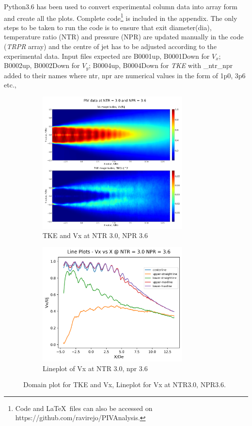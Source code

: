 \par\par
Python3.6 has been used to convert experimental column data into array form and create all the plots. Complete code\footnote{ Code and \LaTeX \ files can also be accessed on https://github.com/ravirejo/PIVAnalysis.} is included in the appendix. The only steps to be taken to run the code is to ensure that exit diameter(dia), temperature ratio (NTR) and pressure (NPR) are updated manually in the code (\textit{TRPR }array) and the centre of jet has to be adjusted according to the experimental data. Input files expected are B0001up, B0001Down for \textit{$V_x$}; B0002up, B0002Down for \textit{$V_y$}; B0004up, B0004Down for \textit{TKE} with \_ntr\_npr added to their names where ntr, npr are numerical values in the form of 1p0, 3p6 etc.,

\begin{figure}[H]
\begin{subfigure}{.5\textwidth}
	\centering
	\includegraphics[width=3in]{images/2dsample.png}
	\caption{TKE and Vx at NTR 3.0, NPR 3.6}
	\label{fig:2dsample}
\end{subfigure}%
\begin{subfigure}{.5\textwidth}
	\centering
	\includegraphics[width=3in]{images/lineplotsample.png}
	\caption{Lineplot of Vx at NTR 3.0, npr 3.6}
	\label{fig:lineplotsample}
\end{subfigure}
\caption{ Domain plot for TKE and Vx, Lineplot for Vx at NTR3.0, NPR3.6.}
\label{fig:2d&lineplot}
\end{figure}

